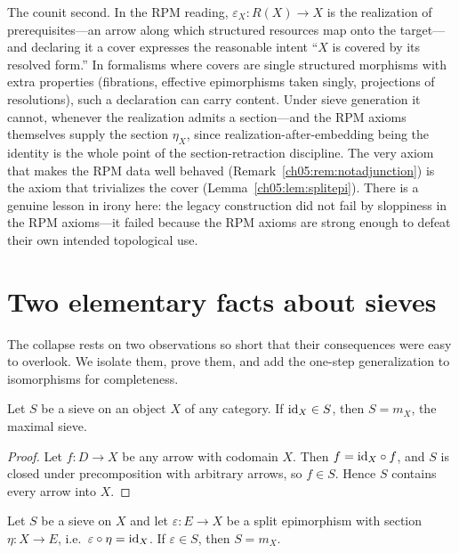 The counit second. In the RPM reading, $\varepsilon_X:R(X)\to X$ is the
realization of prerequisites---an arrow along which structured resources
map onto the target---and declaring it a cover expresses the reasonable
intent ``$X$ is covered by its resolved form.'' In formalisms where covers
are single structured morphisms with extra properties (fibrations,
effective epimorphisms taken singly, projections of resolutions), such a
declaration can carry content. Under sieve generation it cannot, whenever
the realization admits a section---and the RPM axioms themselves supply the
section $\eta_X$, since realization-after-embedding being the identity is
the whole point of the section-retraction discipline. The very axiom that
makes the RPM data well behaved (Remark~\ref{ch05:rem:notadjunction}) is
the axiom that trivializes the cover
(Lemma~\ref{ch05:lem:splitepi}). There is a genuine lesson in irony here:
the legacy construction did not fail by sloppiness in the RPM axioms---it
failed because the RPM axioms are strong enough to defeat their own
intended topological use.

\section{Two elementary facts about sieves}\label{ch05:sec:facts}

The collapse rests on two observations so short that their consequences were
easy to overlook. We isolate them, prove them, and add the one-step
generalization to isomorphisms for completeness.

\begin{lemma}\label{ch05:lem:idmax}
Let $S$ be a sieve on an object $X$ of any category. If $\mathrm{id}_X\in S$, then
$S=m_X$, the maximal sieve.
\end{lemma}

\begin{proof}
Let $f:D\to X$ be any arrow with codomain $X$. Then $f=\mathrm{id}_X\circ f$, and $S$
is closed under precomposition with arbitrary arrows, so $f\in S$. Hence $S$
contains every arrow into $X$.
\end{proof}

\begin{lemma}\label{ch05:lem:splitepi}
Let $S$ be a sieve on $X$ and let $\varepsilon:E\to X$ be a split
epimorphism with section $\eta:X\to E$, i.e.\
$\varepsilon\circ\eta=\mathrm{id}_X$. If $\varepsilon\in S$, then $S=m_X$.
\end{lemma}

